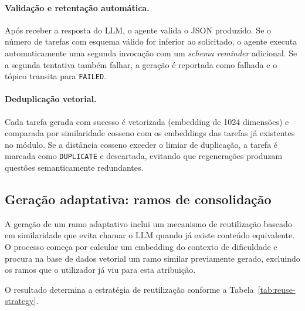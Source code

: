 \paragraph{Valida\c{c}\~ao e retenta\c{c}\~ao autom\'atica.}
Ap\'os receber a resposta do LLM, o agente valida o JSON produzido. Se o
n\'umero de tarefas com esquema v\'alido for inferior ao solicitado, o agente
executa automaticamente uma segunda invoca\c{c}\~ao com um \emph{schema reminder}
adicional. Se a segunda tentativa tamb\'em falhar, a gera\c{c}\~ao \'e reportada
como falhada e o t\'opico transita para \texttt{FAILED}.

\paragraph{Deduplica\c{c}\~ao vetorial.}
Cada tarefa gerada com sucesso \'e vetorizada (embedding de 1024 dimens\~oes)
e comparada por similaridade cosseno com os embeddings das tarefas j\'a
existentes no m\'odulo. Se a dist\^ancia cosseno exceder o limiar de
duplica\c{c}\~ao, a tarefa \'e marcada como \texttt{DUPLICATE} e descartada,
evitando que regenera\c{c}\~oes produzam quest\~oes semanticamente redundantes.

\subsection{Gera\c{c}\~ao adaptativa: ramos de consolida\c{c}\~ao}
\label{ssec:ia-geracao-adaptativa}

A gera\c{c}\~ao de um ramo adaptativo inclui um mecanismo de reutiliza\c{c}\~ao
baseado em similaridade que evita chamar o LLM quando j\'a existe conte\'udo
equivalente. O processo come\c{c}a por calcular um embedding do contexto de
dificuldade e procura na base de dados vetorial um ramo similar previamente
gerado, excluindo os ramos que o utilizador j\'a viu para esta atribui\c{c}\~ao.

O resultado determina a estrat\'egia de reutiliza\c{c}\~ao conforme a
Tabela~\ref{tab:reuse-strategy}.

